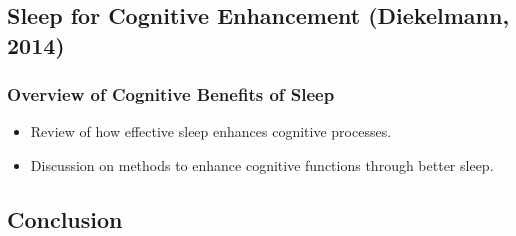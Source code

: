 \subsection{Sleep for Cognitive Enhancement (Diekelmann, 2014)}
\subsubsection{Overview of Cognitive Benefits of Sleep}
\begin{itemize}
    \item Review of how effective sleep enhances cognitive processes.
    \item Discussion on methods to enhance cognitive functions through better sleep.
\end{itemize}

\subsection{Conclusion}
